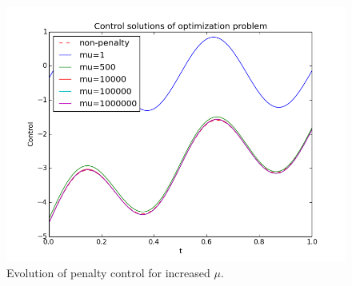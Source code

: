 \documentclass[11pt,a4paper]{article}
\begin{document}
\begin{figure}
  \includegraphics[width=\linewidth]{sin_control.png}
  \caption{Evolution of penalty control for increased $\mu$.}
  \label{Fig 3}
\end{figure}


\end{document}
